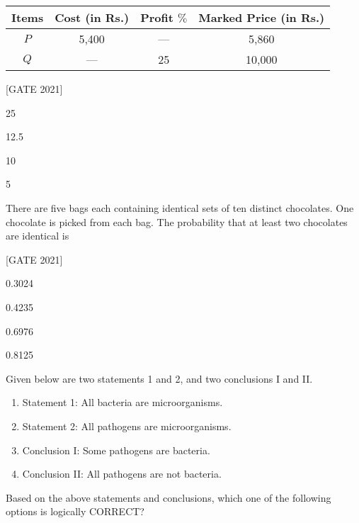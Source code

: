 \begin{center}
\begin{tabular}{|c|c|c|c|}
\hline
Items & Cost (in Rs.) & Profit $\%$ & Marked Price (in Rs.) \\ 
\hline
$P$ & 5,400 & --- & 5,860 \\ 

$Q$ & --- & 25 & 10,000 \\ 
\hline
\end{tabular}
\end{center}

\hfill{[GATE 2021]}
\begin{enumerate}
\begin{multicols}{4}
    \item 25
    \item 12.5
    \item 10
    \item 5
\end{multicols}
\end{enumerate}

\item There are five bags each containing identical sets of ten distinct chocolates. One chocolate is picked from each bag. The probability that at least two chocolates are identical is \underline{\hspace{1.5cm}}

\hfill{[GATE 2021]}
\begin{enumerate}
\begin{multicols}{4}
    \item 0.3024\item 0.4235 \item 0.6976\item 0.8125
\end{multicols}
\end{enumerate}     
    \item  Given below are two statements 1 and 2, and two conclusions I and II.

\begin{enumerate}[label={}]
    \item Statement 1: All bacteria are microorganisms.\item Statement 2: All pathogens are microorganisms.    \item Conclusion I: Some pathogens are bacteria.    \item Conclusion II: All pathogens are not bacteria.
\end{enumerate}

Based on the above statements and conclusions, which one of the following options is logically CORRECT?

